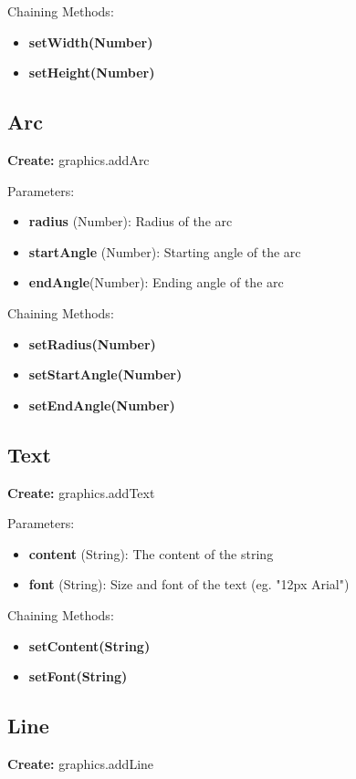 \documentclass{article}
\begin{document}
Chaining Methods:
\begin{itemize}
\item \textbf{setWidth(Number)} 
\item \textbf{setHeight(Number)}
\end{itemize}

\subsection{Arc}
\textbf{Create:} graphics.addArc

Parameters:
\begin{itemize}
\item \textbf{radius} (Number): Radius of the arc
\item \textbf{startAngle} (Number): Starting angle of the arc
\item \textbf{endAngle}(Number): Ending angle of the arc
\end{itemize}

Chaining Methods:
\begin{itemize}
\item \textbf{setRadius(Number)} 
\item \textbf{setStartAngle(Number)}
\item \textbf{setEndAngle(Number)}
\end{itemize}

\subsection{Text}
\textbf{Create:} graphics.addText

Parameters:
\begin{itemize}
\item \textbf{content} (String): The content of the string
\item \textbf{font} (String): Size and font of the text (eg. "12px Arial")
\end{itemize}

Chaining Methods:
\begin{itemize}
\item \textbf{setContent(String)} 
\item \textbf{setFont(String)}
\end{itemize}

\subsection{Line}
\textbf{Create:} graphics.addLine
\end{document}
